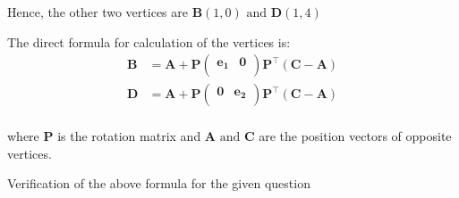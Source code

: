 \documentclass[12pt]{article}
\newcommand{\myvec}[1]{\ensuremath{\begin{pmatrix}#1\end{pmatrix}}}
\let\vec\mathbf
\begin{document}
Hence, the other two vertices are $\vec{B}(1,0) \text{ and } \vec{D}(1,4)$   

The direct formula for calculation of the vertices is:
\begin{align}
\vec{B} &= \vec{A} + \vec{P}\myvec{
\vec{e_{1}}&\vec{0}\\
}
\vec{P}^\top(\vec{C}-\vec{A})\\
\vec{D} &= \vec{A} + \vec{P}\myvec{
\vec{0}&\vec{e_{2}}\\
}
\vec{P}^\top(\vec{C}-\vec{A})\\
\end{align}

where $\vec{P}$ is the rotation matrix and $\vec{A} \text{ and } \vec{C}$ are the position vectors of opposite vertices.

Verification of the above formula for the given question
\end{document}
